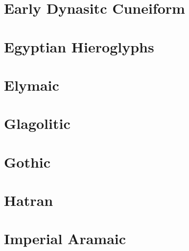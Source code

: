 %








\section{Early Dynasitc Cuneiform}

\section{Egyptian Hieroglyphs}

\section{Elymaic}

\section{Glagolitic}

\section{Gothic}

\section{Hatran}

\section{Imperial Aramaic}

